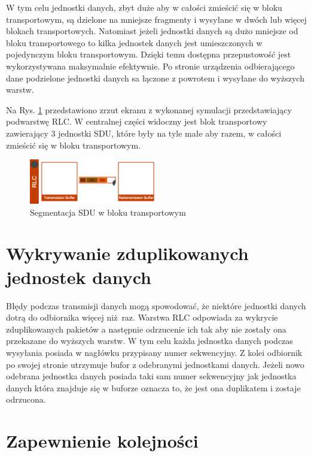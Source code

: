 W tym celu jednostki danych, zbyt duże aby w całości zmieścić się w bloku transportowym, są dzielone na mniejsze fragmenty i wysyłane w dwóch lub więcej blokach transportowych. Natomiast jeżeli jednostki danych są dużo mniejsze od bloku transportowego to kilka jednostek danych jest umieszczonych w pojedynczym bloku transportowym. Dzięki temu dostępna przepustowość jest wykorzystywana maksymalnie efektywnie. Po stronie urządzenia odbierającego dane podzielone jednostki danych sa łączone z powrotem i wysyłane do wyższych warstw.

Na Rys. \ref{fig:rlc_simulation} przedstawiono zrzut ekranu z wykonanej symulacji przedstawiający podwarstwę RLC. W centralnej części widoczny jest blok transportowy zawierający 3 jednostki SDU, które były na tyle małe aby razem, w całości zmieścić się w bloku transportowym.

\begin{figure}
	\centerline{\includegraphics[width=0.5\textwidth]{images/rlc_transport_block.png}}
	\caption{Segmentacja SDU w bloku transportowym}
	\label{fig:rlc_simulation}
\end{figure}
  
\section{Wykrywanie zduplikowanych jednostek danych}

Błędy podczas transmisji danych mogą spowodować, że niektóre jednostki danych dotrą do odbiornika więcej niż raz. Warstwa RLC odpowiada za wykrycie zduplikowanych pakietów a następnie odrzucenie ich tak aby nie zostały ona przekazane do wyższych warstw. W tym celu każda jednostka danych podczas wysyłania posiada w nagłówku przypisany numer sekwencyjny. Z kolei odbiornik po swojej stronie utrzymuje bufor z odebranymi jednostkami danych. Jeżeli nowo odebrana jednostka danych posiada taki sam numer sekwencyjny jak jednostka danych która znajduje się w buforze oznacza to, że jest ona duplikatem i zostaje odrzucona.

\section{Zapewnienie kolejności}

